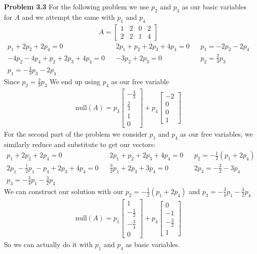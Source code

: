 \documentclass{article}
\begin{document}
\textbf{Problem 3.3} For the following problem we use $p_2$ and $p_3$ as our basic variables for $A$ and we attempt the same with $p_1$ and $p_4$
\begin{align*} A = 
    \begin{bmatrix}
      1 & 2 & 0 & 2 \\
      2 & 2 & 1 & 4
    \end{bmatrix}
\end{align*}
\begin{align*}
    p_1 + 2p_2 + 2p_4 = 0 && 2p_1 + p_2 + 2p_3 + 4p_4 = 0 &&
    p_1 = -2p_2 - 2p_4 \\ -4p_2 - 4p_4 + p_2 + 2p_3 + 4p_4 = 0 && -3p_2 + 2p_3 = 0 && p_2 = \frac{2}{3}p_3 \\
    p_1 = -\frac{4}{3}p_3 - 2p_4
\end{align*}
    Since $p_2 = \frac{2}{3} p_3$ We end up using $p_4$ as our free variable
    \begin{align*}\text{null}(A) = 
    p_3
    \begin{bmatrix}
        -\frac{4}{3} \\ \frac{2}{3} \\ 1 \\ 0
    \end{bmatrix} +
    p_4
    \begin{bmatrix}
        -2 \\ 0 \\ 0 \\ 1
    \end{bmatrix}
\end{align*}
 For the second part of the problem we consider $p_1$ and $p_4$ as our free variables, we similarly reduce and substitute to get our vectors:
\begin{align*}
    p_1 + 2p_2 + 2p_4 = 0 && 2p_1 + p_2 + 2p_3 + 4p_4 = 0 && p_2 = - \frac{1}{2}(p_1 + 2p_4) \\
    2p_1 - \frac{1}{2}p_1 - p_4 + 2p_3 + 4p_4 = 0 && \frac{3}{2}p_1 + 2p_3 + 3p_4 = 0 && 2p_3 = -\frac{3}{2} - 3p_4 \\
    p_3 = -\frac{3}{4}p_1 - \frac{3}{2}p_4  
\end{align*}
    We can construct our solution with our $p_2= -\frac{1}{2}(p_1 + 2p_4)$ and $p_3 = -\frac{3}{4}p_1 - \frac{3}{2}p_4$
    \begin{align*}\text{null}(A) = p_1
    \begin{bmatrix}
        1 \\ -\frac{1}{2} \\ -\frac{3}{4} \\ 0
    \end{bmatrix}
        +  p_4
    \begin{bmatrix}
        0 \\ -1 \\ -\frac{3}{2} \\ 1
    \end{bmatrix}
\end{align*}
So we can actually do it with $p_1$ and $p_4$ as basic variables. \newline
\end{document}
